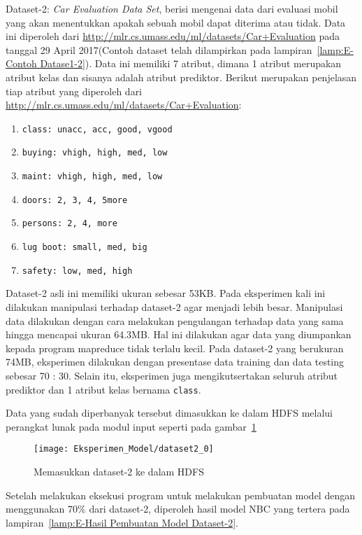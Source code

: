 Dataset-2: \textit{Car Evaluation Data Set}, berisi mengenai data dari evaluasi mobil yang akan menentukkan apakah sebuah mobil dapat diterima atau tidak. Data ini diperoleh dari \url{http://mlr.cs.umass.edu/ml/datasets/Car+Evaluation} pada tanggal 29 April 2017(Contoh dataset telah dilampirkan pada lampiran~\ref{lamp:E-Contoh Datase1-2}). Data ini memiliki 7 atribut, dimana 1 atribut merupakan atribut kelas dan sisanya adalah atribut prediktor. Berikut merupakan penjelasan tiap atribut yang diperoleh dari \url{http://mlr.cs.umass.edu/ml/datasets/Car+Evaluation}:
\begin{enumerate}
	\item \texttt{class: unacc, acc, good, vgood }
	\item \texttt{buying: vhigh, high, med, low}
	\item \texttt{maint: vhigh, high, med, low}
	\item \texttt{doors: 2, 3, 4, 5more}
	\item \texttt{persons: 2, 4, more} 
	\item \texttt{lug boot: small, med, big}
	\item \texttt{safety: low, med, high}
\end{enumerate}

Dataset-2 asli ini memiliki ukuran sebesar 53KB. Pada eksperimen kali ini dilakukan manipulasi terhadap dataset-2 agar menjadi lebih besar. Manipulasi data dilakukan dengan cara melakukan pengulangan terhadap data yang sama hingga mencapai ukuran 64.3MB. Hal ini dilakukan agar data yang diumpankan kepada program mapreduce tidak terlalu kecil. Pada dataset-2 yang berukuran 74MB, eksperimen dilakukan dengan presentase data training dan data testing sebesar 70 : 30. Selain itu, eksperimen juga mengikutsertakan seluruh atribut prediktor dan 1 atribut kelas bernama \texttt{class}.

Data yang sudah diperbanyak tersebut dimasukkan ke dalam HDFS melalui perangkat lunak pada modul input seperti pada gambar~\ref{fig:Memasukkan dataset-2 ke dalam HDFS}

\begin{figure}[H]
	\centering
	\texttt{[image: Eksperimen\_Model/dataset2\_0]}
	\caption[Memasukkan dataset-2 ke dalam HDFS]{Memasukkan dataset-2 ke dalam HDFS}
	\label{fig:Memasukkan dataset-2 ke dalam HDFS}
\end{figure}

Setelah melakukan eksekusi program untuk melakukan pembuatan model dengan menggunakan 70\% dari dataset-2, diperoleh hasil model NBC yang tertera pada lampiran~\ref{lamp:E-Hasil Pembuatan Model Dataset-2}.

